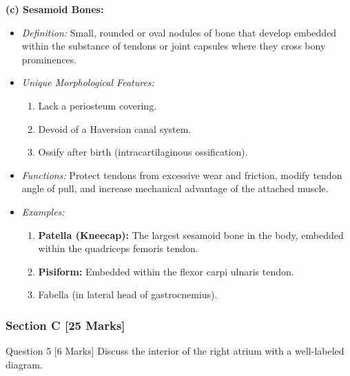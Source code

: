 \documentclass[11pt,a4paper]{article}
\begin{document}
\begin{ansbox}
\textbf{(c) Sesamoid Bones:}
\begin{itemize}[leftmargin=*]
    \item \textit{Definition:} Small, rounded or oval nodules of bone that develop embedded within the substance of tendons or joint capsules where they cross bony prominences.
    \item \textit{Unique Morphological Features:}
    \begin{enumerate}
        \item Lack a periosteum covering.
        \item Devoid of a Haversian canal system.
        \item Ossify after birth (intracartilaginous ossification).
    \end{enumerate}
    \item \textit{Functions:} Protect tendons from excessive wear and friction, modify tendon angle of pull, and increase mechanical advantage of the attached muscle.
    \item \textit{Examples:}
    \begin{enumerate}
        \item \textbf{Patella (Kneecap):} The largest sesamoid bone in the body, embedded within the quadriceps femoris tendon.
        \item \textbf{Pisiform:} Embedded within the flexor carpi ulnaris tendon.
        \item Fabella (in lateral head of gastrocnemius).
    \end{enumerate}
\end{itemize}
\end{ansbox}

\subsubsection{Section C [25 Marks]}

\begin{qbox}{Question 5 [6 Marks]}
Discuss the interior of the right atrium with a well-labeled diagram.
\end{qbox}
\end{document}
